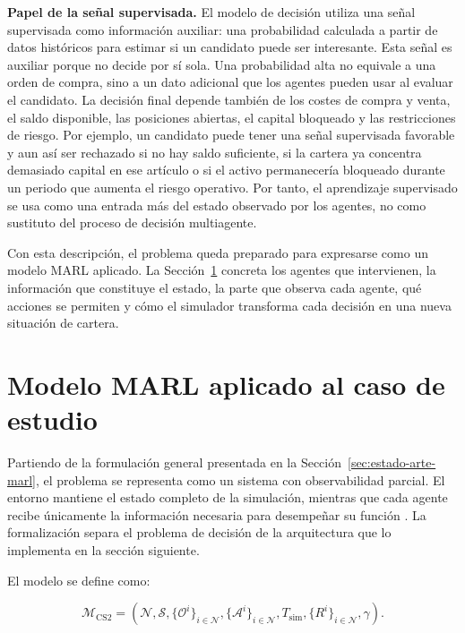 \textbf{Papel de la señal supervisada.} El modelo de decisión utiliza una señal supervisada como información auxiliar: una probabilidad calculada a partir de datos históricos para estimar si un candidato puede ser interesante. Esta señal es auxiliar porque no decide por sí sola. Una probabilidad alta no equivale a una orden de compra, sino a un dato adicional que los agentes pueden usar al evaluar el candidato. La decisión final depende también de los costes de compra y venta, el saldo disponible, las posiciones abiertas, el capital bloqueado y las restricciones de riesgo. Por ejemplo, un candidato puede tener una señal supervisada favorable y aun así ser rechazado si no hay saldo suficiente, si la cartera ya concentra demasiado capital en ese artículo o si el activo permanecería bloqueado durante un periodo que aumenta el riesgo operativo. Por tanto, el aprendizaje supervisado se usa como una entrada más del estado observado por los agentes, no como sustituto del proceso de decisión multiagente.

Con esta descripción, el problema queda preparado para expresarse como un modelo MARL aplicado. La Sección~\ref{sec:formalizacion-marl-problema} concreta los agentes que intervienen, la información que constituye el estado, la parte que observa cada agente, qué acciones se permiten y cómo el simulador transforma cada decisión en una nueva situación de cartera.

\section{Modelo MARL aplicado al caso de estudio}
\label{sec:formalizacion-marl-problema}

Partiendo de la formulación general presentada en la Sección~\ref{sec:estado-arte-marl}, el problema se representa como un sistema  con observabilidad parcial. El entorno mantiene el estado completo de la simulación, mientras que cada agente recibe únicamente la información necesaria para desempeñar su función \cite{kaelbling1998planning,wooldridge2009multiagent,busoniu2008comprehensive}. La formalización separa el problema de decisión de la arquitectura que lo implementa en la sección siguiente.

El modelo se define como:

\begin{equation}
\mathcal{M}_{\mathrm{CS2}}=\left(
\mathcal{N},
\mathcal{S},
\{\mathcal{O}^{i}\}_{i\in\mathcal{N}},
\{\mathcal{A}^{i}\}_{i\in\mathcal{N}},
 T_{\mathrm{sim}},
\{R^{i}\}_{i\in\mathcal{N}},
\gamma\right).
\label{eq:marl-cs2}
\end{equation}

